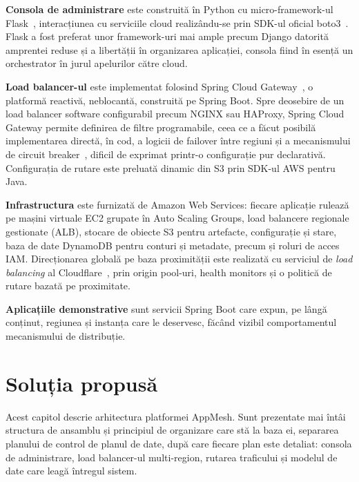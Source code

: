 \documentclass[12pt,a4paper]{report}
\begin{document}
\textbf{Consola de administrare} este construită în Python cu micro-framework-ul Flask~\cite{flask}, interacțiunea cu serviciile cloud realizându-se prin SDK-ul oficial boto3~\cite{boto3}. Flask a fost preferat unor framework-uri mai ample precum Django datorită amprentei reduse și a libertății în organizarea aplicației, consola fiind în esență un orchestrator în jurul apelurilor către cloud.

\textbf{Load balancer-ul} este implementat folosind Spring Cloud Gateway~\cite{scgateway}, o platformă reactivă, neblocantă, construită pe Spring Boot. Spre deosebire de un load balancer software configurabil precum NGINX sau HAProxy, Spring Cloud Gateway permite definirea de filtre programabile, ceea ce a făcut posibilă implementarea directă, în cod, a logicii de failover între regiuni și a mecanismului de circuit breaker~\cite{nygard-circuitbreaker}, dificil de exprimat printr-o configurație pur declarativă. Configurația de rutare este preluată dinamic din S3 prin SDK-ul AWS pentru Java.

\textbf{Infrastructura} este furnizată de Amazon Web Services: fiecare aplicație rulează pe mașini virtuale EC2 grupate în Auto Scaling Groups, load balancere regionale gestionate (ALB), stocare de obiecte S3 pentru artefacte, configurație și stare, baza de date DynamoDB pentru conturi și metadate, precum și roluri de acces IAM. Direcționarea globală pe baza proximității este realizată cu serviciul de \emph{load balancing} al Cloudflare~\cite{cloudflare-lb}, prin origin pool-uri, health monitors și o politică de rutare bazată pe proximitate.

\textbf{Aplicațiile demonstrative} sunt servicii Spring Boot care expun, pe lângă conținut, regiunea și instanța care le deservesc, făcând vizibil comportamentul mecanismului de distribuție.

\chapter{Soluția propusă}

Acest capitol descrie arhitectura platformei AppMesh. Sunt prezentate mai întâi structura de ansamblu și principiul de organizare care stă la baza ei, separarea planului de control de planul de date, după care fiecare plan este detaliat: consola de administrare, load balancer-ul multi-region, rutarea traficului și modelul de date care leagă întregul sistem.
\end{document}
